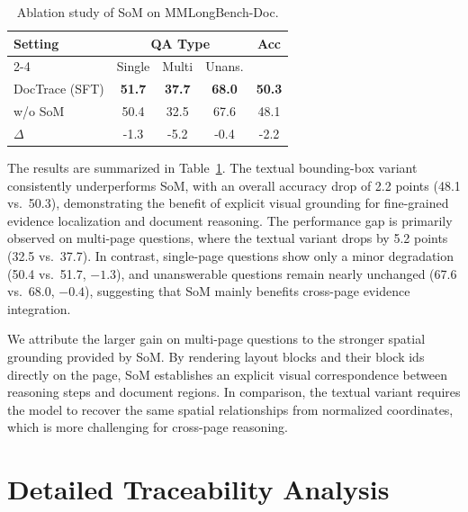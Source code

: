 \documentclass[letterpaper]{article} %
\begin{document}
\begin{table}[h]
\centering
\begin{tabular}{lcccc}
\toprule
\multirow{2}{*}{\textbf{Setting}}
& \multicolumn{3}{c}{\textbf{QA Type}}
& \multirow{2}{*}{\textbf{Acc}} \\
\cmidrule(lr){2-4}
& Single & Multi & Unans. & \\
\midrule

DocTrace (SFT)
& \textbf{51.7}
& \textbf{37.7}
& \textbf{68.0}
& \textbf{50.3} \\

\midrule

w/o SoM
& 50.4
& 32.5
& 67.6
& 48.1 \\

\midrule

$\Delta$
& -1.3
& -5.2
& -0.4
& -2.2 \\

\bottomrule
\end{tabular}
\caption{
Ablation study of SoM on MMLongBench-Doc.
}
\label{tab:ablation_results}
\end{table}


The results are summarized in Table~\ref{tab:ablation_results}. The textual bounding-box variant consistently underperforms SoM, with an overall accuracy drop of 2.2 points (48.1 vs.\ 50.3), demonstrating the benefit of explicit visual grounding for fine-grained evidence localization and document reasoning. The performance gap is primarily observed on multi-page questions, where the textual variant drops by 5.2 points (32.5 vs.\ 37.7). In contrast, single-page questions show only a minor degradation (50.4 vs.\ 51.7, $-1.3$), and unanswerable questions remain nearly unchanged (67.6 vs.\ 68.0, $-0.4$), suggesting that SoM mainly benefits cross-page evidence integration.

We attribute the larger gain on multi-page questions to the stronger spatial grounding provided by SoM. By rendering layout blocks and their block ids directly on the page, SoM establishes an explicit visual correspondence between reasoning steps and document regions. In comparison, the textual variant requires the model to recover the same spatial relationships from normalized coordinates, which is more challenging for cross-page reasoning. 





\section{Detailed Traceability Analysis}
\end{document}
